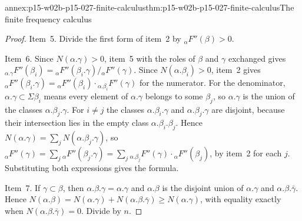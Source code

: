 \begin{annexitem}{annex:p15-w02b-p15-027-finite-calculus}{thm:p15-w02b-p15-027-finite-calculus}{The finite frequency calculus}
\begin{proof}
Item~5. Divide the first form of item~2 by
\({}_{\alpha}F''(\beta)>0\).

Item~6. Since \(N(\alpha.\gamma)>0\), item~5 with the roles of \(\beta\)
and \(\gamma\) exchanged gives
\({}_{\alpha.\gamma}F''(\beta_i)={}_{\alpha}F''(\beta_i.\gamma)/{}_{\alpha}F''(\gamma)\).
Since \(N(\alpha.\beta_i)>0\), item~2 gives
\({}_{\alpha}F''(\beta_i.\gamma)={}_{\alpha}F''(\beta_i)\cdot{}_{\alpha.\beta_i}F''(\gamma)\)
for the numerator. For the denominator, \(\alpha.\gamma\subset\Sigma\beta_i\)
means every element of \(\alpha.\gamma\) belongs to some \(\beta_j\), so
\(\alpha.\gamma\) is the union of the classes \(\alpha.\beta_j.\gamma\).
For \(i\neq j\) the classes \(\alpha.\beta_i.\gamma\) and
\(\alpha.\beta_j.\gamma\) are disjoint, because their intersection lies in
the empty class \(\alpha.\beta_i.\beta_j\). Hence
\(N(\alpha.\gamma)=\sum_jN(\alpha.\beta_j.\gamma)\), so
\({}_{\alpha}F''(\gamma)=\sum_j{}_{\alpha}F''(\beta_j.\gamma)
=\sum_j{}_{\alpha.\beta_j}F''(\gamma)\cdot{}_{\alpha}F''(\beta_j)\),
by item~2 for each \(j\). Substituting both expressions gives the formula.

Item~7. If \(\gamma\subset\beta\), then \(\alpha.\beta.\gamma=\alpha.\gamma\)
and \(\alpha.\beta\) is the disjoint union of \(\alpha.\gamma\) and
\(\alpha.\beta.\bar\gamma\). Hence
\(N(\alpha.\beta)=N(\alpha.\gamma)+N(\alpha.\beta.\bar\gamma)\geq N(\alpha.\gamma)\),
with equality exactly when \(N(\alpha.\beta.\bar\gamma)=0\). Divide by \(n\).
\end{proof}
\end{annexitem}

